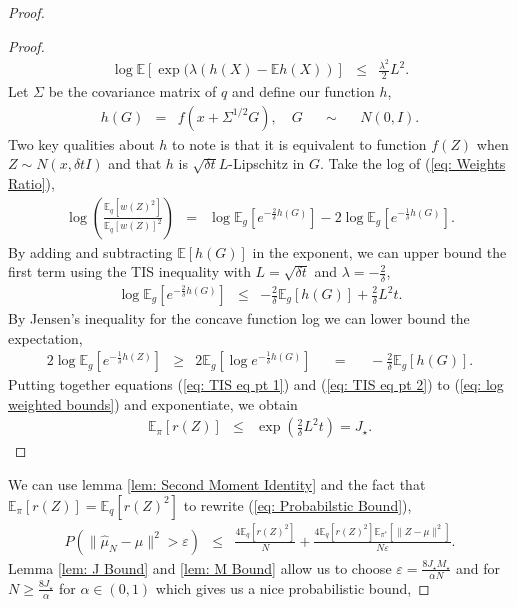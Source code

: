 \documentclass{article}
\newcommand{\E}{\mathbb{E}}
\newcommand{\amp}{\mathop{\:\:\,}\nolimits}
\theoremstyle{plain}
\theoremstyle{definition}
\theoremstyle{remark}
\begin{document}
\begin{proof}
\begin{proof}
\begin{eqnarray}\label{eq: TIS Concentration Inequality}
    \log\E[\exp(\lambda(h(X) - \E h(X))]&\leq& \frac{\lambda^2}{2}L^2.
\end{eqnarray}
Let $\Sigma$ be the covariance matrix of $q$ and define our function $h$, 
\begin{eqnarray}
    h(G) &=& f(x + \Sigma^{1/2}G), \quad G \amp \sim \amp N(0, I).
\end{eqnarray}
Two key qualities about $h$ to note is that it is equivalent to function $f(Z)$ when $Z \sim N(x, \delta tI)$ and that $h$ is $\sqrt{\delta t}L$-Lipschitz in $G$. Take the log of (\ref{eq: Weights Ratio}), 
\begin{eqnarray}
     \log\left(\frac{\E_q[w(Z)^2]}{\E_q[w(Z)]^2}\right) &=& \log \E_g[e^{-\frac{2}{\delta}h(G)}]-2\log\E_g[e^{-\frac{1}{\delta}h(G)}] \label{eq: log weighted bounds}.
\end{eqnarray}
By adding and subtracting $\E[h(G)]$ in the exponent, we can upper bound the first term using the TIS inequality with $L = \sqrt{\delta t}$ and $\lambda = -\frac{2}{\delta}$,
\begin{eqnarray}
    \log \E_g[e^{-\frac{2}{\delta}h(G)}]  &\leq& -\frac{2}{\delta}\E_g[h(G)] + \frac{2}{\delta}L^2t. \label{eq: TIS eq pt 1}
\end{eqnarray}
By Jensen’s inequality for the concave function log  we can lower bound the expectation,
\begin{eqnarray}\label{eq: TIS eq pt 2}
 2\log\E_g[e^{-\frac{1}{\delta}h(Z)}] &\geq& 2\E_g[\log e^{-\frac{1}{\delta}h(G)}] \amp=\amp -\frac{2}{\delta}\E_g[h(G)]. 
\end{eqnarray}
Putting together equations (\ref{eq: TIS eq pt 1}) and (\ref{eq: TIS eq pt 2}) to (\ref{eq: log weighted bounds}) and exponentiate, we obtain
\begin{eqnarray}
    \E_\pi[r(Z)] &\leq& \exp\left(\frac{2}{\delta}L^2t\right) = J_\star.
\end{eqnarray}
\end{proof}
We can use lemma \ref{lem: Second Moment Identity} and the fact that $\E_\pi[r(Z)] = \E_q[r(Z)^2]$ to rewrite (\ref{eq: Probabilstic Bound}), 
\begin{eqnarray}
    P(\|\hat{\mu}_N - \mu\|^2 > \varepsilon) &\leq &\frac{4\E_q[r(Z)^2]}{N} + \frac{4\E_q[r(Z)^2]\E_{\pi^*}[\|Z-\mu\|^2]}{N\varepsilon}. \label{eq: Probabilstic Bound}
\end{eqnarray}
Lemma \ref{lem: J Bound} and \ref{lem: M Bound} allow us to choose $\varepsilon = \frac{8J_\star M_\star}{\alpha N}$ and for $N\geq \frac{8J_\star}{\alpha}$ for $\alpha \in (0,1)$ which gives us a nice probabilistic bound, 

\end{proof}
\end{document}
